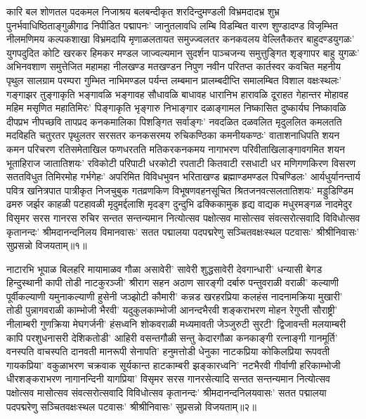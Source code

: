 \begin{flushleft}
कारि बल शोणतल पदकमल निजाश्रय बलबन्दीकृत शरदिन्दुमण्डली विभ्रमदादभ्र शुभ्र पुनर्भवाधिष्ठिताङ्गुळीगाढ निपीडित पद्मापनः' जानुतलावधि लम्बि विडम्बित वारण शुण्डादण्ड विजृम्भित नीलमणिमय कल्पकशाखा विभ्रमदायि मृणाळलतायत समुज्ज्वलतर कनकवलय वेल्लितैकतर बाहुदण्डयुगळः' युगपदुदित कोटि खरकर हिमकर मण्डल जाज्वल्यमान सुदर्शन पाञ्चजन्य समुत्तुङ्गित शृङ्गापर बाहु युगळः' अभिनवशाण समुत्तेजित महामहा नीलखण्ड मतखण्डन निपुण नवीन परितप्त कार्तस्वर कवचित महनीय पृथुल सालग्राम परम्परा गुम्भित नाभिमण्डल पर्यन्त लम्बमान प्रालम्बदीप्ति समालम्बित विशाल वक्षःस्थलः' गङ्गाझर तुङ्गाकृति भङ्गावळि भङ्गावह सौधावळि बाधावह धारानिभ हारावळि दूराहत गेहान्तर मोहावह महिम मसृणित महातिमिरः' पिङ्गाकृति भृङ्गारु निभाङ्गार दळाङ्गामल निष्कासित दुष्कार्यघ निष्कावळि दीपप्रभ नीपच्छवि तापप्रद कनकमालिका पिशङ्गित सर्वाङ्गः' नवदळित दळवलित मृदुललित कमलतति मदविहति चतुरतर पृथुलतर सरसतर कनकसरमय रुचिकण्ठिका कमनीयकण्ठः' वाताशनाधिपति शयन कमन परिचरण रतिसमेताखिल फणधरतति मतिकरकनकमय नागाभरण परिवीताखिलाङ्गावगमित शयन भूताहिराज जातातिशयः' रविकोटी परिपाटी धरकोटी रपताटी कितवाटी रसधाटी धर मणिगणकिरण विसरण सततविधुत तिमिरमोह गर्भगेहः' अपरिमित विविधभुवन भरिताखण्ड ब्रह्माण्डमण्डल पिचण्डिलः' आर्यधुर्यानन्तार्य पवित्र खनित्रपात पात्रीकृत निजचुबुक गतव्रणकिण विभूषणवहनसूचित श्रितजनवत्सलतातिशयः' मड्डुडिण्डिम ढमरु जर्झर काहळी पटहावळी मृदुमर्द्दलाशि मृदङ्ग दुन्दुभि ढक्किकामुक हृद्य वाद्यक मधुरमङ्गळ नादमेदुर विसृमर सरस गानरस रुचिर सन्तत सन्तन्यमान नित्योत्सव पक्षोत्सव मासोत्सव संवत्सरोत्सवादि विविधोत्सव कृतानन्दः' श्रीमदानन्दनिलय विमानवासः' सतत पद्मालया पदपद्मरेणु सञ्चितवक्षःस्थल पटवासः' श्रीश्रीनिवासः' सुप्रसन्नो विजयताम्॥१॥

नाटारभि भूपाळ बिलहरि मायामाळव गौळा असावेरी' सावेरी
शुद्धसावेरी देवगान्धारी' धन्यासी बेगड हिन्दुस्थानी कापी तोडी नाटकुरञ्जी' श्रीराग सहन अठाण सारङ्गी दर्बारु पन्तुवराळी वराळी' कल्याणी पूर्वीकल्याणी यमुनाकल्याणी हुसेनी जञ्झोटी कौमारी'
कन्नड खरहरप्रिया कलहंस नादनामक्रिया मुखारी' तोडी पुन्नागवराळी
काम्भोजी भैरवी' यदुकुलकाम्भोजी आनन्दभैरवी शङ्कराभरण मोहन
रेगुप्ती सौराष्ट्री' नीलाम्बरी गुणक्रिया मेघगर्जनी' हंसध्वनि शोकवराळी मध्यमावती जेञ्जुरुटी सुरटी' द्विजावन्ती मलयाम्बरी कापि
परशुधनासरी देशिकतोडी' आहिरी वसन्तगौळी सन्तु केदारगौळा कनकाङ्गी रत्नाङ्गी गानमूर्ति' वनस्पति वाचस्पति दानवती मानरूपी सेनापति' हनुमत्तोडी धेनुका नाटकप्रिया कोकिलप्रिया रूपवती गायकप्रिया' वकुळाभरण चक्रवाक सूर्यकान्त हाटकाम्बरी
झङ्कारध्वनि' नटभैरवी गीर्वाणी हरिकाम्भोजी धीरशङ्कराभरण नागानन्दिनी यागप्रिया' विसृमर सरस गानरसेत्यादि सन्तत
सन्तन्यमान नित्योत्सव पक्षोत्सव मासोत्सव संवत्सरोत्सवादि
विविधोत्सव कृतानन्दः' श्रीमदानन्दनिलयवासः' सतत पद्मालया पदपद्मरेणु सञ्चितवक्षःस्थल पटवासः' श्रीश्रीनिवासः' सुप्रसन्नो विजयताम्॥२॥


\end{flushleft}
